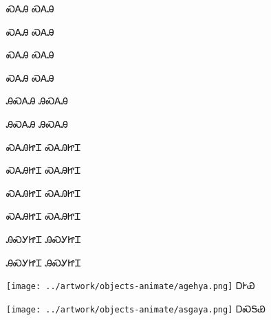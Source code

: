 \documentclass[avery5371,frame]{flashcards}%
\begin{document}
\begin{flashcard}{\Huge ᏍᎪᎯ}
\Huge ᏍᎪᎯ
\end{flashcard}

\begin{flashcard}{\Huge ᏍᎪᎯ}
\Huge ᏍᎪᎯ
\end{flashcard}

\begin{flashcard}{\Huge ᏍᎪᎯ}
\Huge ᏍᎪᎯ
\end{flashcard}

\begin{flashcard}{\Huge ᏍᎪᎯ}
\Huge ᏍᎪᎯ
\end{flashcard}

\begin{flashcard}{\Huge ᎯᏍᎪᎯ}
\Huge ᎯᏍᎪᎯ
\end{flashcard}

\begin{flashcard}{\Huge ᎯᏍᎪᎯ}
\Huge ᎯᏍᎪᎯ
\end{flashcard}

\begin{flashcard}{\Huge ᏍᎪᎯᏥᏆ}
\Huge ᏍᎪᎯᏥᏆ
\end{flashcard}

\begin{flashcard}{\Huge ᏍᎪᎯᏥᏆ}
\Huge ᏍᎪᎯᏥᏆ
\end{flashcard}

\begin{flashcard}{\Huge ᏍᎪᎯᏥᏆ}
\Huge ᏍᎪᎯᏥᏆ
\end{flashcard}

\begin{flashcard}{\Huge ᏍᎪᎯᏥᏆ}
\Huge ᏍᎪᎯᏥᏆ
\end{flashcard}

\begin{flashcard}{\Huge ᎯᏍᎩᏥᏆ}
\Huge ᎯᏍᎩᏥᏆ
\end{flashcard}

\begin{flashcard}{\Huge ᎯᏍᎩᏥᏆ}
\Huge ᎯᏍᎩᏥᏆ
\end{flashcard}


\begin{flashcard}{
\texttt{[image: ../artwork/objects-animate/agehya.png]}
}
\Huge ᎠᎨᏯ
\end{flashcard}

\begin{flashcard}{
\texttt{[image: ../artwork/objects-animate/asgaya.png]}
}
\Huge ᎠᏍᎦᏯ
\end{flashcard}
\end{document}
